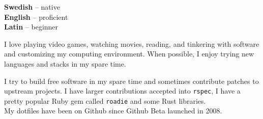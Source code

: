 \documentclass[9pt]{developercv} %
\begin{document}

\begin{minipage}[t]{0.3\textwidth}
  \vspace{-\baselineskip} %


  \textbf{Swedish} -- native\\
  \textbf{English} -- proficient\\
  \textbf{Latin} -- beginner
\end{minipage}
\hfill
\begin{minipage}[t]{0.3\textwidth}
  \vspace{-\baselineskip} %


  I love playing video games, watching movies, reading, and tinkering with
  software and customizing my computing environment. When possible, I enjoy
  trying new languages and stacks in my spare time.
\end{minipage}
\hfill
\begin{minipage}[t]{0.3\textwidth}
  \vspace{-\baselineskip} %


  I try to build free software in my spare time and sometimes contribute
  patches to upstream projects. I have larger contributions accepted into
  \texttt{rspec}, I have a pretty popular Ruby gem called \texttt{roadie} and
  some Rust libraries.\\
  My dotfiles have been on Github since Github Beta launched in 2008.
\end{minipage}


\end{document}

